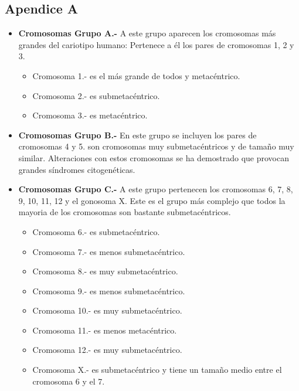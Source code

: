 \documentclass[12pt,letterpaper,titlepage]{article}
\begin{document}
\begin{itemize}
\newpage


\section{Apendice A}\label{apendicea}
\begin{itemize}\itemsep=0pt
\item  \textbf{Cromosomas Grupo A.-} A este grupo aparecen los cromosomas más grandes del cariotipo humano: Pertenece a él los pares de cromosomas 1, 2 y 3.\\

\begin{itemize}\itemsep=0pt
\item  {Cromosoma 1.-} es el más grande de todos y metacéntrico. 
\item  {Cromosoma 2.-} es submetacéntrico. 
\item  {Cromosoma 3.-} es metacéntrico. 
\end{itemize}

\item  \textbf{Cromosomas Grupo B.-} En este grupo se incluyen los pares de cromosomas 4 y 5. son cromosomas muy submetacéntricos y de tamaño muy similar. Alteraciones con estos cromosomas se ha demostrado que provocan grandes síndromes citogenéticas.
\item  \textbf{Cromosomas Grupo C.-} A este grupo pertenecen los cromosomas 6, 7, 8, 9, 10, 11, 12 y el gonosoma X. Este es el grupo más complejo que todos la mayoria de los cromosomas son bastante submetacéntricos.\\
\begin{itemize}\itemsep=0pt
\item  {Cromosoma 6.-} es submetacéntrico. 
\item  {Cromosoma 7.-} es menos submetacéntrico. 
\item  {Cromosoma 8.-} es muy submetacéntrico. 
\item  {Cromosoma 9.-} es menos submetacéntrico. 
\item  {Cromosoma 10.-} es muy submetacéntrico. 
\item  {Cromosoma 11.-} es menos metacéntrico. 
\item  {Cromosoma 12.-} es muy submetacéntrico. 
\item  {Cromosoma X.-} es submetacéntrico y tiene un tamaño medio entre el cromosoma 6 y el 7. 
\end{itemize}


\end{itemize}
\end{itemize}
\end{document}
